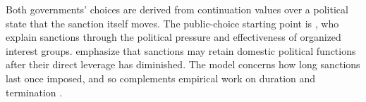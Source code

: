  Both governments' choices are derived
from continuation values over a political state that the sanction itself
moves. The public-choice starting point is \citet{Kaempfer1988}, who explain
sanctions through the political pressure and effectiveness of organized interest
groups. \citet{HalcoussisKaempferLowenberg2021} emphasize that sanctions may
retain domestic political functions after their direct leverage has diminished.
The model concerns how long sanctions last once imposed, and so complements
empirical work on duration and termination
\citep{BolksAlSowayel2000,AttiaGrauvogelVonSoest2020,AttiaGrauvogel2023}.

